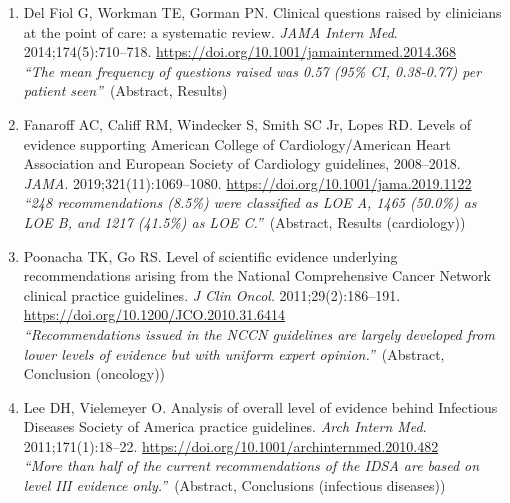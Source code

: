 \documentclass[12pt]{article}
\begin{document}
\vspace{12pt}
{\fontsize{10.5}{13.5}\selectfont\setlength{\parskip}{0pt}
\par\vspace{4pt}
\begin{enumerate}[leftmargin=1.8em,itemsep=5pt,topsep=0pt,label=\arabic*.]
\item \hypertarget{ref-delfiol2014}{}Del Fiol G, Workman TE, Gorman PN. Clinical questions raised by clinicians at the point of care: a systematic review. \textit{JAMA Intern Med}. 2014;174(5):710--718. \url{https://doi.org/10.1001/jamainternmed.2014.368}\\[1pt]{\color{quote}\itshape ``The mean frequency of questions raised was 0.57 (95\% CI, 0.38-0.77) per patient seen''}~{\color{quote}\footnotesize(Abstract, Results)}
\item \hypertarget{ref-fanaroff2019}{}Fanaroff AC, Califf RM, Windecker S, Smith SC Jr, Lopes RD. Levels of evidence supporting American College of Cardiology/American Heart Association and European Society of Cardiology guidelines, 2008--2018. \textit{JAMA}. 2019;321(11):1069--1080. \url{https://doi.org/10.1001/jama.2019.1122}\\[1pt]{\color{quote}\itshape ``248 recommendations (8.5\%) were classified as LOE A, 1465 (50.0\%) as LOE B, and 1217 (41.5\%) as LOE C.''}~{\color{quote}\footnotesize(Abstract, Results (cardiology))}
\item \hypertarget{ref-poonacha2011}{}Poonacha TK, Go RS. Level of scientific evidence underlying recommendations arising from the National Comprehensive Cancer Network clinical practice guidelines. \textit{J Clin Oncol}. 2011;29(2):186--191. \url{https://doi.org/10.1200/JCO.2010.31.6414}\\[1pt]{\color{quote}\itshape ``Recommendations issued in the NCCN guidelines are largely developed from lower levels of evidence but with uniform expert opinion.''}~{\color{quote}\footnotesize(Abstract, Conclusion (oncology))}
\item \hypertarget{ref-lee2011}{}Lee DH, Vielemeyer O. Analysis of overall level of evidence behind Infectious Diseases Society of America practice guidelines. \textit{Arch Intern Med}. 2011;171(1):18--22. \url{https://doi.org/10.1001/archinternmed.2010.482}\\[1pt]{\color{quote}\itshape ``More than half of the current recommendations of the IDSA are based on level III evidence only.''}~{\color{quote}\footnotesize(Abstract, Conclusions (infectious diseases))}

\end{enumerate}}
\end{document}
